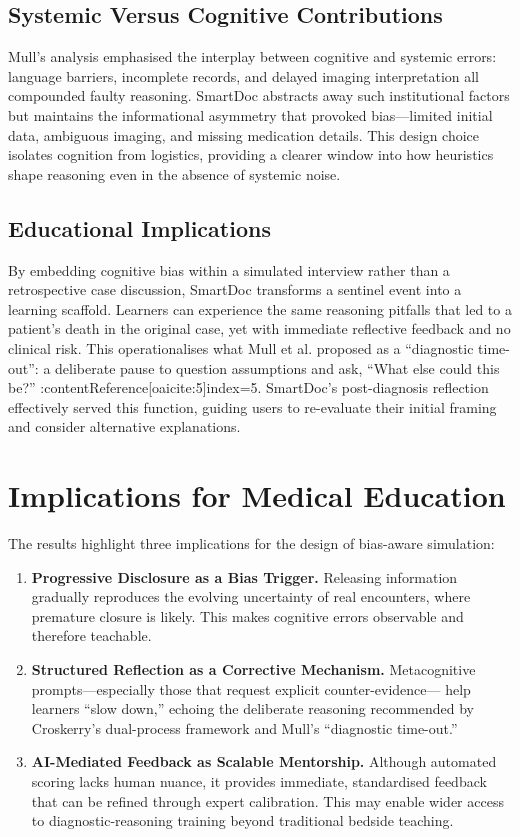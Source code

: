 \subsection{Systemic Versus Cognitive Contributions}

Mull’s analysis emphasised the interplay between cognitive and systemic errors:
language barriers, incomplete records, and delayed imaging interpretation
all compounded faulty reasoning.  
SmartDoc abstracts away such institutional factors but maintains the informational
asymmetry that provoked bias—limited initial data, ambiguous imaging, and missing
medication details.  
This design choice isolates cognition from logistics, providing a clearer window into
how heuristics shape reasoning even in the absence of systemic noise.

\subsection{Educational Implications}

By embedding cognitive bias within a simulated interview rather than a retrospective
case discussion, SmartDoc transforms a sentinel event into a learning scaffold.
Learners can experience the same reasoning pitfalls that led to a patient’s death
in the original case, yet with immediate reflective feedback and no clinical risk.
This operationalises what Mull et al. proposed as a “diagnostic time-out”:
a deliberate pause to question assumptions and ask, “What else could this be?”
:contentReference[oaicite:5]{index=5}.  
SmartDoc’s post-diagnosis reflection effectively served this function, guiding users
to re-evaluate their initial framing and consider alternative explanations.

\section{Implications for Medical Education}

The results highlight three implications for the design of bias-aware simulation:

\begin{enumerate}
  \item \textbf{Progressive Disclosure as a Bias Trigger.}
  Releasing information gradually reproduces the evolving uncertainty of real
  encounters, where premature closure is likely.
  This makes cognitive errors observable and therefore teachable.

  \item \textbf{Structured Reflection as a Corrective Mechanism.}
  Metacognitive prompts—especially those that request explicit counter-evidence—
  help learners “slow down,” echoing the deliberate reasoning recommended by
  Croskerry’s dual-process framework and Mull’s “diagnostic time-out.”

  \item \textbf{AI-Mediated Feedback as Scalable Mentorship.}
  Although automated scoring lacks human nuance, it provides immediate,
  standardised feedback that can be refined through expert calibration.
  This may enable wider access to diagnostic-reasoning training beyond traditional
  bedside teaching.
\end{enumerate}

